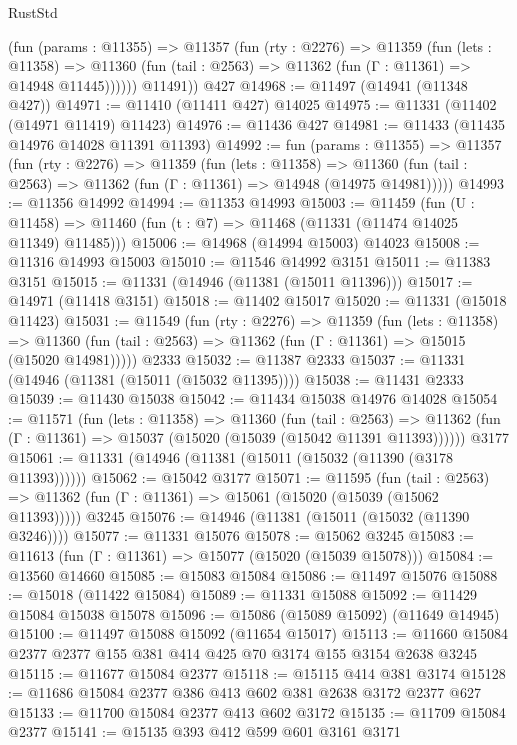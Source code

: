 \begin{lexlean}{RustStd}
\begin{coremodule}
          (fun (params : @11355) =>
          @11357
            (fun (rty : @2276) =>
            @11359
              (fun (lets : @11358) =>
              @11360 (fun (tail : @2563) => @11362 (fun (Γ : @11361) => @14948 @11445))))))
        @11491))
    @427
@14968 := @11497 (@14941 (@11348 @427))
@14971 := @11410 (@11411 @427) @14025
@14975 := @11331 (@11402 (@14971 @11419) @11423)
@14976 := @11436 @427
@14981 := @11433 (@11435 @14976 @14028 @11391 @11393)
@14992 := fun (params : @11355) =>
  @11357
    (fun (rty : @2276) =>
    @11359
      (fun (lets : @11358) =>
      @11360 (fun (tail : @2563) => @11362 (fun (Γ : @11361) => @14948 (@14975 @14981)))))
@14993 := @11356 @14992
@14994 := @11353 @14993
@15003 := @11459
    (fun (U : @11458) => @11460 (fun (t : @7) => @11468 (@11331 (@11474 @14025 @11349) @11485)))
@15006 := @14968 (@14994 @15003) @14023
@15008 := @11316 @14993 @15003
@15010 := @11546 @14992 @3151
@15011 := @11383 @3151
@15015 := @11331 (@14946 (@11381 (@15011 @11396)))
@15017 := @14971 (@11418 @3151)
@15018 := @11402 @15017
@15020 := @11331 (@15018 @11423)
@15031 := @11549
    (fun (rty : @2276) =>
    @11359
      (fun (lets : @11358) =>
      @11360 (fun (tail : @2563) => @11362 (fun (Γ : @11361) => @15015 (@15020 @14981)))))
    @2333
@15032 := @11387 @2333
@15037 := @11331 (@14946 (@11381 (@15011 (@15032 @11395))))
@15038 := @11431 @2333
@15039 := @11430 @15038
@15042 := @11434 @15038 @14976 @14028
@15054 := @11571
    (fun (lets : @11358) =>
    @11360
      (fun (tail : @2563) =>
      @11362 (fun (Γ : @11361) => @15037 (@15020 (@15039 (@15042 @11391 @11393))))))
    @3177
@15061 := @11331 (@14946 (@11381 (@15011 (@15032 (@11390 (@3178 @11393))))))
@15062 := @15042 @3177
@15071 := @11595
    (fun (tail : @2563) => @11362 (fun (Γ : @11361) => @15061 (@15020 (@15039 (@15062 @11393)))))
    @3245
@15076 := @14946 (@11381 (@15011 (@15032 (@11390 @3246))))
@15077 := @11331 @15076
@15078 := @15062 @3245
@15083 := @11613 (fun (Γ : @11361) => @15077 (@15020 (@15039 @15078)))
@15084 := @13560 @14660
@15085 := @15083 @15084
@15086 := @11497 @15076
@15088 := @15018 (@11422 @15084)
@15089 := @11331 @15088
@15092 := @11429 @15084 @15038 @15078
@15096 := @15086 (@15089 @15092) (@11649 @14945)
@15100 := @11497 @15088 @15092 (@11654 @15017)
@15113 := @11660 @15084 @2377 @2377 @155 @381 @414 @425 @70 @3174 @155 @3154 @2638 @3245
@15115 := @11677 @15084 @2377
@15118 := @15115 @414 @381 @3174
@15128 := @11686 @15084 @2377 @386 @413 @602 @381 @2638 @3172 @2377 @627
@15133 := @11700 @15084 @2377 @413 @602 @3172
@15135 := @11709 @15084 @2377
@15141 := @15135 @393 @412 @599 @601 @3161 @3171

\end{coremodule}
\end{lexlean}
